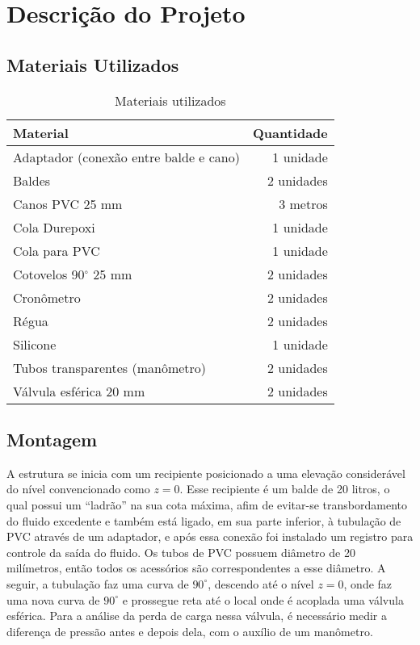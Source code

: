 \chapter{Descrição do Projeto}\label{descricao}

\section{Materiais Utilizados}

 \begin{table}[H]\label{t:custos}
     \centering
     \begin{tabular}{l r}
         \toprule
         \textbf{Material} & \textbf{Quantidade} \\
         \midrule
         Adaptador (conexão entre balde e cano) & 1 unidade \\
         Baldes & 2 unidades \\
         Canos PVC 25 mm &  3 metros \\
         Cola Durepoxi & 1 unidade \\
         Cola para PVC & 1 unidade \\
         Cotovelos 90$^\circ$ 25 mm & 2 unidades \\
         Cronômetro & 2 unidades \\
         Régua & 2 unidades \\
         Silicone & 1 unidade \\
         Tubos transparentes (manômetro) & 2 unidades \\
         Válvula esférica 20 mm & 2 unidades \\
         \bottomrule
     \end{tabular}
     \caption{Materiais utilizados}
 \end{table}

\section{Montagem}
\label{sec:montagem}

A estrutura se inicia com um recipiente posicionado a uma elevação 
considerável do nível convencionado como $z = 0$. Esse
recipiente é um balde de 20 litros, o qual possui um ``ladrão''
na sua cota máxima, afim de evitar-se transbordamento do fluido excedente e também
está ligado, em sua parte inferior, 
à tubulação de PVC através de um
adaptador, e após essa conexão foi instalado um registro para controle da 
saída do fluido. Os tubos de PVC possuem diâmetro de 20 milímetros, então todos
os acessórios são correspondentes a esse diâmetro. A seguir, a tubulação faz
uma curva de $90^\circ$, descendo até o nível $z = 0$, 
onde faz uma nova curva de $90^\circ$
e prossegue reta até o local onde é
acoplada uma válvula esférica. Para a análise da perda de carga nessa válvula, é
necessário medir a diferença de pressão antes e depois dela, com o auxílio de um
manômetro.

